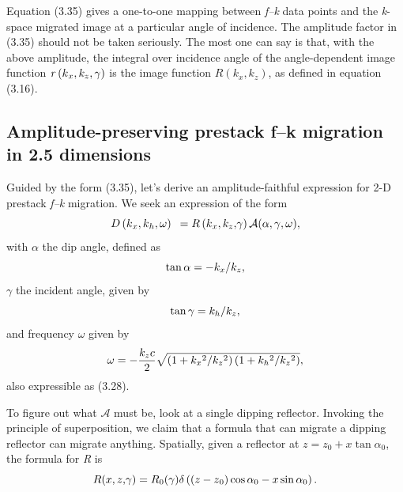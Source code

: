 Equation (3.35) gives a one-to-one mapping between \textit{f--k} data points and the \hbox{\textit{k}-space} migrated image at a particular angle of incidence.
The amplitude factor in (3.35) should not be taken seriously. The most one can say is that, with the above amplitude, the integral over incidence
angle of the angle-dependent image function \(\text{\textit{$\mathit{r}$}}\left(\text{\textit{$k$}}_x,k_z,\gamma \right)\) is the image function
\(R\left(k_x,k_z\right)\), as defined in equation (3.16).

\subsection{Amplitude-preserving prestack f--k migration in 2.5 dimensions}

Guided by the form (3.35), let's derive an amplitude-faithful expression for 2-D prestack \textit{f--k} migration. We seek an expression
of the form
\begin{equation}\text{\textit{$D$}}\left(\text{\textit{$k$}}_{\text{\textit{$x$}}},\text{\textit{$k$}}_{\text{\textit{$h$}}},\omega \right)\text{
 }= \text{\textit{$R$}}\left(\text{\textit{$k$}}_{\text{\textit{$x$}}},\text{\textit{$k_z$}}\text{\textit{$,$}}\gamma \right) \mathcal{A}(\alpha
,\gamma ,\omega ),\end{equation}
with $\alpha $ the dip angle, defined as
\begin{equation}\tan  \alpha  =- \text{\textit{$k_x$}}/\text{\textit{$k_z$}},\end{equation}
$\gamma $ the incident angle, given by
\begin{equation}\tan  \gamma  = \text{\textit{$k_h$}}/\text{\textit{$k_z$}},\end{equation}
and frequency $\omega $ given by
\begin{equation}\omega =-\frac{\text{\textit{$k_zc$}}}{2}\sqrt{\left(1+\text{\textit{$k_x$}}{}^2/\text{\textit{$k_z$}}{}^2\right)\left(1+\text{\textit{$k_h$}}{}^2/\text{\textit{$k_z$}}{}^2\right)},\end{equation}
also expressible as (3.28).

To figure out what $\mathcal{A}$ must be, look at a single dipping reflector. Invoking the principle of superposition, we claim that a formula
that can migrate a dipping reflector can migrate anything. Spatially, given a reflector at \(z=z_0+x \tan  \alpha _0\), the formula for \textit{R} is
\begin{equation}\text{\textit{$R$}}(\text{\textit{$x$}},\text{\textit{$z$}}\text{\textit{$,$}}\gamma ) =\text{\textit{$R$}}_0(\gamma )\delta \left(\left(\text{\textit{$z$}}-\text{\textit{$z$}}_0\right)\cos
 \alpha _0-\text{\textit{$x$}}\text{\textit{$ $}}\sin  \alpha _0\right).\end{equation}


